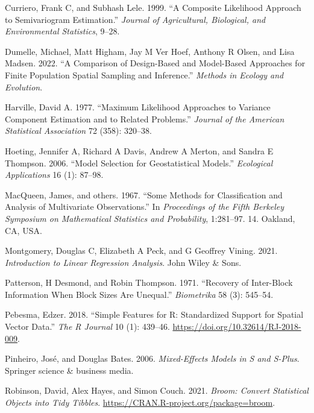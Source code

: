 \documentclass{article}
\begin{document}
\leavevmode\hypertarget{ref-curriero1999composite}{}%
Curriero, Frank C, and Subhash Lele. 1999. ``A Composite Likelihood
Approach to Semivariogram Estimation.'' \emph{Journal of Agricultural,
Biological, and Environmental Statistics}, 9--28.

\leavevmode\hypertarget{ref-dumelle2022comparison}{}%
Dumelle, Michael, Matt Higham, Jay M Ver Hoef, Anthony R Olsen, and Lisa
Madsen. 2022. ``A Comparison of Design-Based and Model-Based Approaches
for Finite Population Spatial Sampling and Inference.'' \emph{Methods in
Ecology and Evolution}.

\leavevmode\hypertarget{ref-harville1977maximum}{}%
Harville, David A. 1977. ``Maximum Likelihood Approaches to Variance
Component Estimation and to Related Problems.'' \emph{Journal of the
American Statistical Association} 72 (358): 320--38.

\leavevmode\hypertarget{ref-hoeting2006model}{}%
Hoeting, Jennifer A, Richard A Davis, Andrew A Merton, and Sandra E
Thompson. 2006. ``Model Selection for Geostatistical Models.''
\emph{Ecological Applications} 16 (1): 87--98.

\leavevmode\hypertarget{ref-macqueen1967some}{}%
MacQueen, James, and others. 1967. ``Some Methods for Classification and
Analysis of Multivariate Observations.'' In \emph{Proceedings of the
Fifth Berkeley Symposium on Mathematical Statistics and Probability},
1:281--97. 14. Oakland, CA, USA.

\leavevmode\hypertarget{ref-montgomery2021introduction}{}%
Montgomery, Douglas C, Elizabeth A Peck, and G Geoffrey Vining. 2021.
\emph{Introduction to Linear Regression Analysis}. John Wiley \& Sons.

\leavevmode\hypertarget{ref-patterson1971recovery}{}%
Patterson, H Desmond, and Robin Thompson. 1971. ``Recovery of
Inter-Block Information When Block Sizes Are Unequal.''
\emph{Biometrika} 58 (3): 545--54.

\leavevmode\hypertarget{ref-pebesma2018sf}{}%
Pebesma, Edzer. 2018. ``Simple Features for R: Standardized Support for
Spatial Vector Data.'' \emph{The R Journal} 10 (1): 439--46.
\url{https://doi.org/10.32614/RJ-2018-009}.

\leavevmode\hypertarget{ref-pinheiro2006mixed}{}%
Pinheiro, José, and Douglas Bates. 2006. \emph{Mixed-Effects Models in S
and S-Plus}. Springer science \& business media.

\leavevmode\hypertarget{ref-robinson2021broom}{}%
Robinson, David, Alex Hayes, and Simon Couch. 2021. \emph{Broom: Convert
Statistical Objects into Tidy Tibbles}.
\url{https://CRAN.R-project.org/package=broom}.
\end{document}
